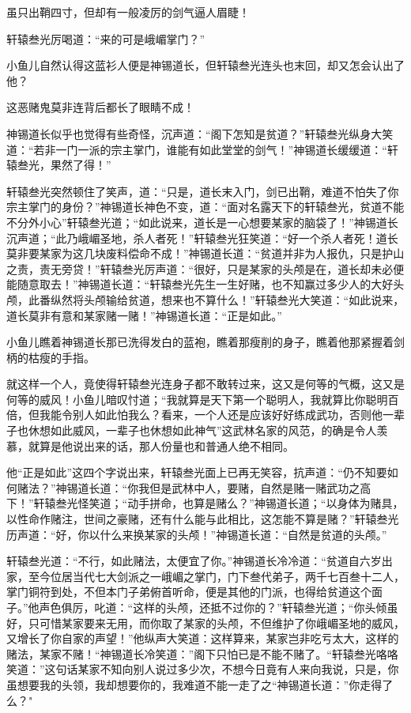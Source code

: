 \documentclass[12pt,oneside]{book}
\begin{document}
虽只出鞘四寸，但却有一般凌厉的剑气逼人眉睫！

轩辕叁光厉喝道：``来的可是峨嵋掌门？''

小鱼儿自然认得这蓝衫人便是神锡道长，但轩辕叁光连头也末回，却又怎会认出了他？

这恶赌鬼莫非连背后都长了眼睛不成！

神锡道长似乎也觉得有些奇怪，沉声道：``阁下怎知是贫道？''轩辕叁光纵身大笑道：``若非一门一派的宗主掌门，谁能有如此堂堂的剑气！''神锡道长缓缓道：``轩辕叁光，果然了得！''

轩辕叁光突然顿住了笑声，道：``只是，道长末入门，剑已出鞘，难道不怕失了你宗主掌门的身份？''神锡道长神色不变，道：``面对名露天下的轩辕叁光，贫道不能不分外小心''轩辕叁光道；``如此说来，道长是一心想要某家的脑袋了！''神锡道长沉声道；``此乃峨嵋圣地，杀人者死！''轩辕叁光狂笑道：``好一个杀人者死！道长莫非要某家为这几块废料偿命不成！''神锡道长道：``贫道并非为人报仇，只是护山之责，责无旁贷！''轩辕叁光厉声道：``很好，只是某家的头颅是在，道长却未必便能随意取去！''神锡道长道：``轩辕叁光先生一生好赌，也不知赢过多少人的大好头颅，此番纵然将头颅输给贫道，想来也不算什么！''轩辕叁光大笑道：``如此说来，道长莫非有意和某家赌一赌！''神锡道长道：``正是如此。''

小鱼儿瞧着神锡道长那已洗得发白的蓝袍，瞧着那瘦削的身子，瞧着他那紧握着剑柄的枯瘦的手指。

就这样一个人，竟使得轩辕叁光连身子都不敢转过来，这又是何等的气概，这又是何等的威风！小鱼儿暗叹忖道；``我就算是天下第一个聪明人，我就算比你聪明百倍，但我能令别人如此怕我么？看来，一个人还是应该好好练成武功，否则他一辈子也休想如此威风，一辈子也休想如此神气''这武林名家的风范，的确是令人羡慕，就算是他说出来的话，那人份量也和普通人绝不相同。

他``正是如此''这四个字说出来，轩辕叁光面上已再无笑容，抗声道：``仍不知要如何赌法？''神锡道长道：``你我但是武林中人，要赌，自然是赌一赌武功之高下！''轩辕叁光怪笑道；``动手拼命，也算是赌么？''神锡道长道；``以身体为赌具，以性命作赌注，世间之豪赌，还有什么能与此相比，这怎能不算是赌？''轩辕叁光历声道：``好，你以什么来换某家的头颅！''神锡道长道：``自然是贫道的头颅。''

轩辕叁光道：``不行，如此赌法，太便宜了你。''神锡道长冷冷道：``贫道自六岁出家，至今位居当代七大剑派之一峨嵋之掌门，门下叁代弟子，两千七百叁十二人，掌门铜符到处，不但本门子弟俯首听命，便是其他的门派，也得给贫道这个面子。''他声色俱厉，叱道：``这样的头颅，还抵不过你的？''轩辕叁光道；``你头倾虽好，只可惜某家要来无用，而你取了某家的头颅，不但维护了你峨嵋圣地的威风，又增长了你自家的声望！''他纵声大笑道：这样算来，某家岂非吃亏太大，这样的赌法，某家不赌！``神锡道长冷笑道：''阁下只怕已是不能不赌了。``轩辕叁光咯咯笑道：''这句话某家不知向别人说过多少次，不想今日竟有人来向我说，只是，你虽想要我的头领，我却想要你的，我难道不能一走了之``神锡道长道：''你走得了么？"
\end{document}
